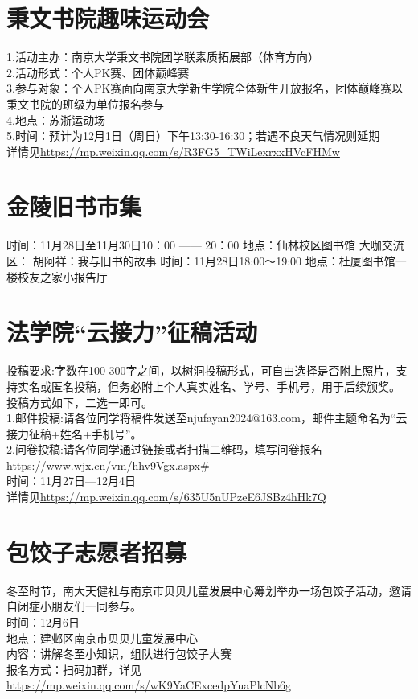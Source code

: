 \documentclass[letterpaper, 12pt]{article}
\begin{document}
\begin{multicols}{2}
\section{秉文书院趣味运动会}
1.活动主办：南京大学秉文书院团学联素质拓展部（体育方向）\\
2.活动形式：个人PK赛、团体巅峰赛\\
3.参与对象：个人PK赛面向南京大学新生学院全体新生开放报名，团体巅峰赛以秉文书院的班级为单位报名参与\\
4.地点：苏浙运动场\\
5.时间：预计为12月1日（周日）下午13:30-16:30；若遇不良天气情况则延期\\
详情见\url{https://mp.weixin.qq.com/s/R3FG5_TWiLexrxxHVcFHMw}\\
\section{金陵旧书市集}
时间：11月28日至11月30日10：00 —— 20：00
地点：仙林校区图书馆
大咖交流区：
胡阿祥：我与旧书的故事
时间：11月28日18:00～19:00
地点：杜厦图书馆一楼校友之家小报告厅

\section{法学院“云接力”征稿活动}
投稿要求:字数在100-300字之间，以树洞投稿形式，可自由选择是否附上照片，支持实名或匿名投稿，但务必附上个人真实姓名、学号、手机号，用于后续颁奖。\\
投稿方式如下，二选一即可。\\
1.邮件投稿:请各位同学将稿件发送至njufayan2024@163.com，邮件主题命名为“云接力征稿+姓名+手机号”。\\
2.问卷投稿:请各位同学通过链接或者扫描二维码，填写问卷报名\url{https://www.wjx.cn/vm/hhv9Vgx.aspx#} \\
时间：11月27日—12月4日\\
详情见\url{https://mp.weixin.qq.com/s/635U5nUPzeE6JSBz4hHk7Q}\\




\section{包饺子志愿者招募}
冬至时节，南大天健社与南京市贝贝儿童发展中心筹划举办一场包饺子活动，邀请自闭症小朋友们一同参与。\\
时间：12月6日\\
地点：建邺区南京市贝贝儿童发展中心\\
内容：讲解冬至小知识，组队进行包饺子大赛\\
报名方式：扫码加群，详见\url{https://mp.weixin.qq.com/s/wK9YaCExcedpYuaPlcNb6g}


\end{multicols}
\end{document}
